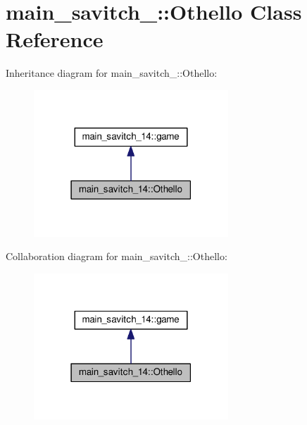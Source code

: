 \hypertarget{classmain__savitch__14_1_1Othello}{}\section{main\+\_\+savitch\+\_\+:\+:Othello Class Reference}
\label{classmain__savitch__14_1_1Othello}


Inheritance diagram for main\+\_\+savitch\+\_\+:\+:Othello\+:
\nopagebreak
\begin{figure}[H]
\begin{center}
\leavevmode
\includegraphics[width=207pt]{classmain__savitch__14_1_1Othello__inherit__graph}
\end{center}
\end{figure}


Collaboration diagram for main\+\_\+savitch\+\_\+:\+:Othello\+:
\nopagebreak
\begin{figure}[H]
\begin{center}
\leavevmode
\includegraphics[width=207pt]{classmain__savitch__14_1_1Othello__coll__graph}
\end{center}
\end{figure}
